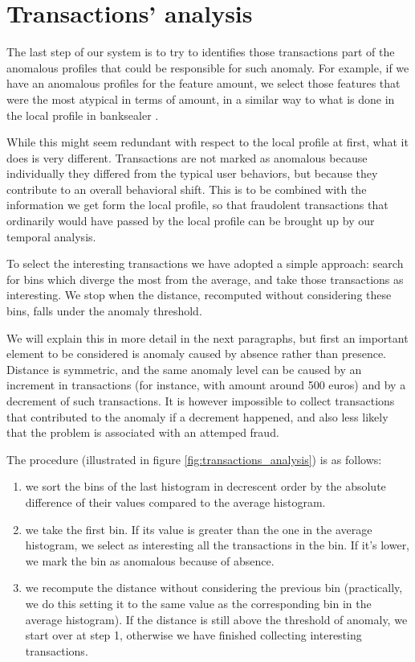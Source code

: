 \section{Transactions' analysis}
\label{sec:transactions_analysis}

The last step of our system is to try to identifies those transactions part of the anomalous profiles that could be responsible for such anomaly. For example, if we have an anomalous profiles for the feature amount, we select those features that were the most atypical in terms of amount, in a similar way to what is done in the local profile in banksealer \cite{banksealer}.

While this might seem redundant with respect to the local profile at first, what it does is very different. Transactions are not marked as anomalous because individually they differed from the typical user behaviors, but because they contribute to an overall behavioral shift. This is to be combined with the information we get form the local profile, so that fraudolent transactions that ordinarily would have passed by the local profile can be brought up by our temporal analysis.

To select the interesting transactions we have adopted a simple approach: search for bins which diverge the most from the average, and take those transactions as interesting. We stop when the distance, recomputed without considering these bins, falls under the anomaly threshold.

We will explain this in more detail in the next paragraphs, but first an important element to be considered is anomaly caused by absence rather than presence. Distance is symmetric, and the same anomaly level can be caused by an increment in transactions (for instance, with amount around 500 euros) and by a decrement of such transactions. It is however impossible to collect transactions that contributed to the anomaly if a decrement happened, and also less likely that the problem is associated with an attemped fraud.

The procedure (illustrated in figure \ref{fig:transactions_analysis}) is as follows:

\begin{enumerate}
  \item we sort the bins of the last histogram in decrescent order by the absolute difference of their values compared to the average histogram.
  \item we take the first bin. If its value is greater than the one in the average histogram, we select as interesting all the transactions in the bin. If it's lower, we mark the bin as anomalous because of absence.
  \item we recompute the distance without considering the previous bin (practically, we do this setting it to the same value as the corresponding bin in the average histogram). If the distance is still above the threshold of anomaly, we start over at step 1, otherwise we have finished collecting interesting transactions.
\end{enumerate}

